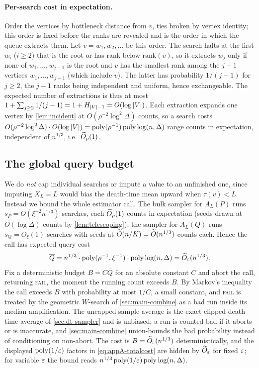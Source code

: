 \paragraph{Per-search cost in expectation.}
Order the vertices by bottleneck distance from $v$, ties broken by vertex identity; this order is fixed
before the ranks are revealed and is the order in which the queue extracts them. Let $v=w_1,w_2,\dots$ be this order. The search halts at the first $w_i$ ($i\ge2$) that is the root or has
rank below $\mathrm{rank}(v)$, so it extracts $w_j$ only if none of $w_1,\dots,w_{j-1}$ is the root and $v$
has the smallest rank among the $j-1$ vertices $w_1,\dots,w_{j-1}$ (which include $v$). The latter has
probability $1/(j-1)$ for $j\ge2$, the $j-1$ ranks being independent and uniform, hence exchangeable. The expected number of extractions is thus at most
$1+\sum_{j\ge2}1/(j-1)=1+H_{\left|V\right|-1}=O(\log\left|V\right|)$. Each extraction expands one vertex by
\cref{lem:incident} at $O(\rho^{-2}\log^2\Delta)$ counts, so a search costs
$O(\rho^{-2}\log^2\Delta)\cdot O(\log\left|V\right|)=\operatorname{poly}(\rho^{-1})\operatorname{poly}\log(n,\Delta)$ range counts in
expectation, independent of $n^{1/3}$, i.e.\ $\widetilde{O}_\rho(1)$.

\subsection{The global query budget}\label{sec:wspd-cap}

We do \emph{not} cap individual searches or impute a value to an unfinished one, since imputing $X_L=L$
would bias the death-time mean upward when $\tau(v)<L$. Instead we bound the whole estimator call.
The bulk sampler for $A_L(P)$ runs $s_P=O(\xi^{-2}n^{1/3})$ searches, each $\widetilde{O}_\rho(1)$ counts in
expectation (seeds drawn at $O(\log\Delta)$ counts by \cref{lem:telescoping}); the sampler for $A_L(Q)$
runs $s_Q=O_\xi(1)$ searches with seeds at $\widetilde{O}(n/K)=\widetilde{O}(n^{1/3})$ counts each. Hence the call has
expected query cost
\begin{equation}\label{eq:appA-totalcost}
  \overline Q=n^{1/3}\cdot\operatorname{poly}(\rho^{-1},\xi^{-1})\cdot\operatorname{poly}\log(n,\Delta)=\widetilde{O}_\varepsilon(n^{1/3}).
\end{equation}
Fix a deterministic budget $B=C\overline Q$ for an absolute constant $C$ and abort the call, returning
\textsc{fail}, the moment the running count exceeds $B$. By Markov's inequality the call exceeds $B$ with
probability at most $1/C$, a small constant, and \textsc{fail} is treated by the geometric $W$-search of
\cref{sec:main-combine} as a bad run inside its median amplification. The uncapped sample average is the
exact clipped death-time average of \cref{sec:dt-sampler} and is unbiased; a run is counted bad if it
aborts or is inaccurate, and \cref{sec:main-combine} union-bounds the bad probability instead of
conditioning on non-abort. The cost is
$B=\widetilde{O}_\varepsilon(n^{1/3})$ deterministically, and the displayed $\operatorname{poly}(1/\varepsilon)$ factors in
\eqref{eq:appA-totalcost} are hidden by $\widetilde{O}_\varepsilon$ for fixed $\varepsilon$; for variable $\varepsilon$ the bound reads
$n^{1/3}\operatorname{poly}(1/\varepsilon)\operatorname{poly}\log(n,\Delta)$.

